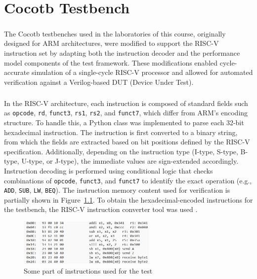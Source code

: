 \documentclass[12pt]{report}
\begin{document}
\chapter{Cocotb Testbench}
\paragraph{}
The Cocotb testbenches used in the laboratories of this course, originally designed for ARM architectures, were modified to support the RISC-V instruction set by adapting both the instruction decoder and the performance model components of the test framework. These modifications enabled cycle-accurate simulation of a single-cycle RISC-V processor and allowed for automated verification against a Verilog-based DUT (Device Under Test).

\paragraph{}
In the RISC-V architecture, each instruction is composed of standard fields such as \texttt{opcode}, \texttt{rd}, \texttt{funct3}, \texttt{rs1}, \texttt{rs2}, and \texttt{funct7}, which differ from ARM’s encoding structure. To handle this, a Python class was implemented to parse each 32-bit hexadecimal instruction. The instruction is first converted to a binary string, from which the fields are extracted based on bit positions defined by the RISC-V specification. Additionally, depending on the instruction type (I-type, S-type, B-type, U-type, or J-type), the immediate values are sign-extended accordingly. Instruction decoding is performed using conditional logic that checks combinations of \texttt{opcode}, \texttt{funct3}, and \texttt{funct7} to identify the exact operation (e.g., \texttt{ADD}, \texttt{SUB}, \texttt{LW}, \texttt{BEQ}). The instruction memory content used for verification is partially shown in Figure~\ref{fig:instr}. To obtain the hexadecimal-encoded instructions for the testbench, the RISC-V instruction converter tool was used \cite{rvcodecjs}.


\begin{figure}[h]
    \centering
    \includegraphics[width=0.6\textwidth]{figures/exp_intrhex.png}
    \caption{Some part of instructions used for the test}
    \label{fig:instr}
\end{figure}
\end{document}
